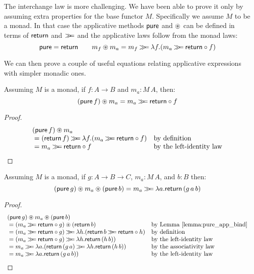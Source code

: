
The interchange law is more challenging.
We have been able to prove it only by assuming extra properties for the base functor $M$.
Specifically we assume $M$ to be a monad.
In that case the applicative methods $\mathsf{pure}$ and $\circledast$ can be defined in terms of $\mathsf{return}$ and $\mathbin{\gg\!\!=}$ and the applicative laws follow from the monad laws:
$$
\mathsf{pure} = \mathsf{return}
\qquad
m_f \circledast m_a = m_f \mathbin{\gg\!\!=} \lambda f. (m_a \mathbin{\gg\!\!=} \mathsf{return}\circ f)
$$

We can then prove a couple of useful equations relating applicative expressions with simpler monadic ones.

\begin{lemma}\label{lemma:pure_app_bind}
Assuming $M$ is a monad, 
if $f:A\rightarrow B$ and $m_a:M\,A$, then:
$$
(\mathsf{pure}\,f)\circledast m_a = m_a \mathbin{\gg\!\!=} \mathsf{return}\circ f
$$
\end{lemma}
\begin{proof}
$$
\begin{array}{ll}
(\mathsf{pure}\,f)\circledast m_a\\
{}= (\mathsf{return}\,f) \mathbin{\gg\!\!=} \lambda f. (m_a \mathbin{\gg\!\!=} \mathsf{return}\circ f)
  & \mbox{by definition}\\
{}= m_a \mathbin{\gg\!\!=} \mathsf{return}\circ f
  & \mbox{by the left-identity law}
\end{array}
$$
\end{proof}

\begin{lemma}\label{lemma:pure_app_pure_bind}
Assuming $M$ is a monad, 
if $g:A\rightarrow B\rightarrow C$, $m_a:M\,A$, and $b:B$ then:
$$
(\mathsf{pure}\,g) \circledast m_a \circledast (\mathsf{pure}\,b) = m_a \mathbin{\gg\!\!=} \lambda a. \mathsf{return}\,(g\,a\,b)
$$
\end{lemma}
\begin{proof}
$$
\begin{array}{ll}
(\apure\,g) \appl m_a \appl (\apure\,b)\\
{}= (m_a \bind \return\comp g) \appl (\return\,b)
  & \mbox{by Lemma \ref{lemma:pure_app_bind}}\\
{}= (m_a \bind \return\comp g) \bind \lambda h. (\return\,b \bind \return \comp h)
  & \mbox{by definition}\\
{}= (m_a \bind \return\comp g) \bind \lambda h. \return\,(h\,b))
  & \mbox{by the left-identity law}\\
{}= m_a \bind \lambda a. (\return\,(g\,a) \bind \lambda h. \return\,(h\,b))
  & \mbox{by the associativity law}\\
{}= m_a \bind \lambda a. \return\,(g\,a\,b))
  & \mbox{by the left-identity law}
\end{array}
$$
\end{proof}

